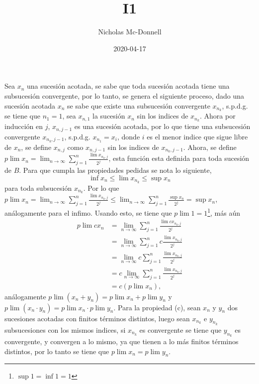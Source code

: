 \documentclass{homework}
\title{I1}
\date{2020-04-17}
\author{Nicholas Mc-Donnell}
\begin{document}
\maketitle
\newpage
{}

\begin{sol}
    Sea \(x_n\) una sucesión acotada, se sabe que toda sucesión acotada tiene una subsucesión convergente, por lo tanto, se genera el siguiente proceso, dado una sucesión acotada \(x_n\) se sabe que existe una subsucesión convergente \(x_{n_k}\), s.p.d.g. se tiene que \(n_1=1\), sea \(x_{n,1}\) la sucesión \(x_n\) sin los indices de \(x_{n_k}\). Ahora por inducción en \(j\), \(x_{n,j-1}\) es una sucesión acotada, por lo que tiene una subsucesión convergente \(x_{n_k,j-1}\), s.p.d.g. \(x_{n_1}=x_i\), donde \(i\) es el menor indice que sigue libre de \(x_n\), se define \(x_{n,j}\) como \(x_{n,j-1}\) sin los indices de \(x_{n_k,j-1}\). Ahora, se define \(p\lim x_n=\lim_{n\rightarrow\infty}\sum_{j=1}^n\frac{\lim x_{n_k,j}}{2^j}\), esta función esta definida para toda sucesión de \(B\). Para que cumpla las propiedades pedidas se nota lo siguiente,
    \begin{equation*}
        \inf x_n\leq \lim x_{n_k}\leq \sup x_n
    \end{equation*}
    para toda subsucesión \(x_{n_k}\). Por lo que \(p\lim x_n=\lim_{n\rightarrow\infty}\sum_{j=1}^n\frac{\lim x_{n_k,j}}{2^j}\leq\lim_{n\rightarrow\infty}\sum_{j=1}^n\frac{\sup x_n}{2^j}=\sup x_n\), análogamente para el infimo. Usando esto, se tiene que \(p\lim 1=1\)\footnote{\(\sup 1=\inf 1=1\)}, más aún 
    \begin{align*}
        p\lim cx_n&=\lim_{n\rightarrow\infty}\sum_{j=1}^n\frac{\lim cx_{n_k,j}}{2^j}\\
        &=\lim_{n\rightarrow\infty}\sum_{j=1}^nc\frac{\lim x_{n_k,j}}{2^j}\\
        &=\lim_{n\rightarrow\infty}c\sum_{j=1}^n\frac{\lim x_{n_k,j}}{2^j}\\
        &=c\lim_{n\rightarrow\infty}\sum_{j=1}^n\frac{\lim x_{n_k,j}}{2^j}\\
        &=c(p\lim x_n),
    \end{align*}
    análogamente \(p\lim (x_n+y_n)=p\lim x_n+p\lim y_n\) y \(p\lim (x_n\cdot y_n)=p\lim x_n\cdot p\lim y_n\). Para la propiedad (c), sean \(x_n\) y \(y_n\) dos sucesiones acotadas con finitos términos distintos, luego sean \(x_{n_k}\) e \(y_{n_k}\) subsucesiones con los mismos indices, si \(x_{n_k}\) es convergente se tiene que \(y_{n_k}\) es convergente, y convergen a lo mismo, ya que tienen a lo más finitos términos distintos, por lo tanto se tiene que \(p\lim x_n=p\lim y_n\).
\end{sol}
\end{document}

